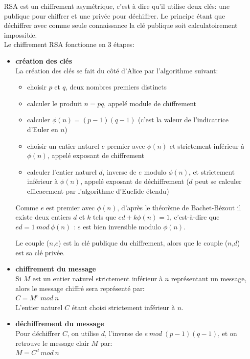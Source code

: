 RSA est un chiffrement asymétrique, c'est à dire qu'il utilise deux clés: une publique pour chiffrer et une privée pour déchiffrer. Le principe étant que déchiffrer avec comme seule connaissance la clé publique soit calculatoirement impossible. \\

Le chiffrement RSA fonctionne en 3 étapes:
\begin{itemize}
\item \textbf{création des clés} \\
La création des clés se fait du c\^oté d'Alice par l'algorithme suivant:
\begin{itemize}
\item choisir $p$ et $q$, deux nombres premiers distincts
\item calculer le produit $n = pq$, appelé module de chiffrement 
\item calculer $\phi(n) = (p - 1)(q -1)$ (c'est la valeur de l'indicatrice d'Euler en $n$) 
\item choisir un entier naturel $e$ premier avec $\phi(n)$ et strictement inférieur à  $\phi(n)$, appelé exposant de chiffrement
\item calculer l'entier naturel $d$, inverse de $e$ modulo  $\phi(n)$, et strictement inférieur à  $\phi(n)$, appelé exposant de déchiffrement ($d$ peut se calculer efficacement par l'algorithme d'Euclide étendu)
\end{itemize}
Comme $e$ est premier avec  $\phi(n)$, d'après le théorème de Bachet-Bézout il existe deux entiers $d$ et $k$ tels que $ed + k \phi(n) = 1$, c'est-à-dire que $ed = 1\ mod\ \phi(n)$ : $e$ est bien inversible modulo $\phi(n)$.

Le couple ($n$,$e$) est la clé publique du chiffrement, alors que le couple ($n$,$d$) est sa clé privée.

\item \textbf{chiffrement du message} \\
Si $M$ est un entier naturel strictement inférieur à $n$ représentant un message, alors le message chiffré sera représenté par: \\
$C = M^e\ mod\ n$ \\
L'entier naturel $C$ étant choisi strictement inférieur à $n$.

\item \textbf{déchiffrement du message} \\
Pour déchiffrer $C$, on utilise $d$, l'inverse de $e\ mod\ (p-1)(q-1)$, et on retrouve le message clair $M$ par: \\
$M = C^d\ mod\ n$ \\

\end{itemize}

